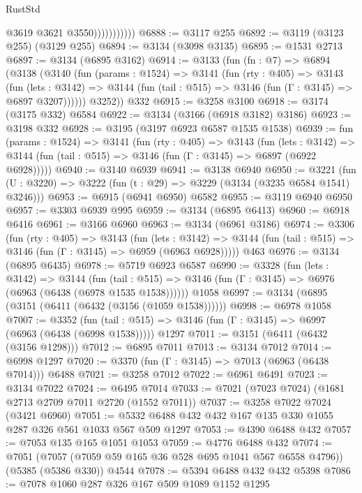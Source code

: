 \begin{lexlean}{RustStd}
\begin{coremodule}
                          @3619
                          @3621
                          @3550)))))))))))
@6888 := @3117 @255
@6892 := @3119 (@3123 @255) (@3129 @255)
@6894 := @3134 (@3098 @3135)
@6895 := @1531 @2713
@6897 := @3134 (@6895 @3162)
@6914 := @3133
    (fun (fn : @7) =>
    @6894
      (@3138
        (@3140
          (fun (params : @1524) =>
          @3141
            (fun (rty : @405) =>
            @3143
              (fun (lets : @3142) =>
              @3144 (fun (tail : @515) => @3146 (fun (Γ : @3145) => @6897 @3207))))))
        @3252))
    @332
@6915 := @3258 @3100
@6918 := @3174 (@3175 @332) @6584
@6922 := @3134 (@3166 (@6918 @3182) @3186)
@6923 := @3198 @332
@6928 := @3195 (@3197 @6923 @6587 @1535 @1538)
@6939 := fun (params : @1524) =>
  @3141
    (fun (rty : @405) =>
    @3143
      (fun (lets : @3142) =>
      @3144 (fun (tail : @515) => @3146 (fun (Γ : @3145) => @6897 (@6922 @6928)))))
@6940 := @3140 @6939
@6941 := @3138 @6940
@6950 := @3221 (fun (U : @3220) => @3222 (fun (t : @29) => @3229 (@3134 (@3235 @6584 @1541) @3246)))
@6953 := @6915 (@6941 @6950) @6582
@6955 := @3119 @6940 @6950
@6957 := @3303 @6939 @995
@6959 := @3134 (@6895 @6413)
@6960 := @6918 @6416
@6961 := @3166 @6960
@6963 := @3134 (@6961 @3186)
@6974 := @3306
    (fun (rty : @405) =>
    @3143
      (fun (lets : @3142) =>
      @3144 (fun (tail : @515) => @3146 (fun (Γ : @3145) => @6959 (@6963 @6928)))))
    @463
@6976 := @3134 (@6895 @6435)
@6978 := @5719 @6923 @6587
@6990 := @3328
    (fun (lets : @3142) =>
    @3144
      (fun (tail : @515) => @3146 (fun (Γ : @3145) => @6976 (@6963 (@6438 (@6978 @1535 @1538))))))
    @1058
@6997 := @3134 (@6895 (@3151 (@6411 (@6432 (@3156 (@1059 @1538))))))
@6998 := @6978 @1058
@7007 := @3352
    (fun (tail : @515) => @3146 (fun (Γ : @3145) => @6997 (@6963 (@6438 (@6998 @1538)))))
    @1297
@7011 := @3151 (@6411 (@6432 (@3156 @1298)))
@7012 := @6895 @7011
@7013 := @3134 @7012
@7014 := @6998 @1297
@7020 := @3370 (fun (Γ : @3145) => @7013 (@6963 (@6438 @7014))) @6488
@7021 := @3258 @7012
@7022 := @6961 @6491
@7023 := @3134 @7022
@7024 := @6495 @7014
@7033 := @7021 (@7023 @7024) (@1681 @2713 @2709 @7011 @2720 (@1552 @7011))
@7037 := @3258 @7022 @7024 (@3421 @6960)
@7051 := @5332 @6488 @432 @432 @167 @135 @330 @1055 @287 @326 @561 @1033 @567 @509 @1297
@7053 := @4390 @6488 @432
@7057 := @7053 @135 @165 @1051 @1053
@7059 := @4776 @6488 @432
@7074 := @7051
    (@7057 (@7059 @59 @165 @36 @528 @695 @1041 @567 @6558 @4796))
    (@5385 (@5386 @330))
    @4544
@7078 := @5394 @6488 @432 @432 @5398
@7086 := @7078 @1060 @287 @326 @167 @509 @1089 @1152 @1295

\end{coremodule}
\end{lexlean}
